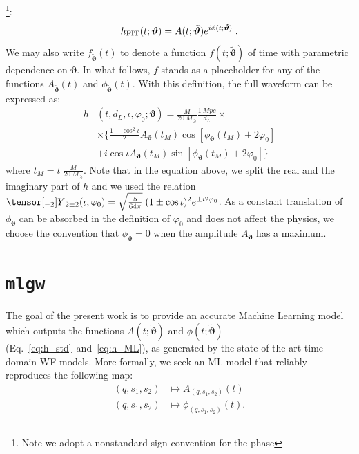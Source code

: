\documentclass[twocolumn,showpacs,preprintnumbers,nofootinbib,prd,
superscriptaddress,10pt]{revtex4-1}
\begin{document}
\footnote{Note we adopt a nonstandard sign convention for the phase}:
\begin{equation} \label{eq:h_ML}
	h_{\rm FIT}(t; \boldsymbol{\vartheta}) = A(t; \boldsymbol{\tilde{\vartheta}}) e^{i \phi(t; \boldsymbol{\tilde{\vartheta}})} \; . 
\end{equation}
We may also write $f_{\boldsymbol{\tilde{\vartheta}}}(t)$ to denote a 
function $f(t;\boldsymbol{\tilde{\vartheta}})$ of time with parametric dependence on $\boldsymbol{\vartheta}$.
In what follows, $f$ stands as a placeholder for any of the functions $A_{\tilde{\boldsymbol{\vartheta}}}(t)$ 
and ${\phi}_{\tilde{\boldsymbol{\vartheta}}}(t)$.
With this definition, the full waveform can be expressed as:
\begin{align} 
	h&(t, d_L,\iota,\varphi_0; \boldsymbol{\vartheta}) = \frac{M}{\SI{20}{M_\odot}} \frac{\SI{1}{Mpc}}{d_L} \times  \nonumber \\
		&\times \Bigg\{ \frac{1+\cos^2\iota}{2} A_{\boldsymbol{\vartheta}}(t_M)  \cos[\phi_{\boldsymbol{\vartheta}}(t_M)+2\varphi_0]  \nonumber \\
		&+ i \cos\iota A_{\boldsymbol{\vartheta}}(t_M)
 \sin[\phi_{\boldsymbol{\vartheta}}(t_M)+2\varphi_0] \Bigg\}
\label{eq:h_parametrization_simple}
\end{align}
where $t_M = t \; \frac{M}{\SI{20}{M_\odot}}$.
Note that in the equation above, we split the real and the imaginary part of $h$ and we 
used the relation ${\tensor[_{-2}]{Y}{_{2 \pm 2}}(\iota, \varphi_0) = \sqrt{\frac{5}{64\pi}} \; (1 \pm \cos \iota)^2 e^{\pm i 2 \varphi_0}}$.
As a constant translation of $\phi_{\boldsymbol{\vartheta}}$ can be absorbed in the definition of $\varphi_0$ and does not affect the physics, we choose the convention that $\phi_{\boldsymbol{\vartheta}} = 0$ when the amplitude $A_{\boldsymbol{\vartheta}}$ 
has a maximum.

\section{\lowercase{\texttt{mlgw}}}
\label{sec:model}
%
The goal of the present work is to provide an accurate Machine Learning model which outputs the functions $A(t;\boldsymbol{\tilde{\vartheta}})$ and $\phi(t;\boldsymbol{\tilde{\vartheta}})$ (Eq.~\eqref{eq:h_std}~and~\eqref{eq:h_ML}), as generated by the state-of-the-art time domain WF models.
More formally, we seek an ML model that reliably reproduces the following map:
\begin{align}
	(q, s_1, s_2) &\longmapsto A_{(q, s_1, s_2)}(t) \label{eq:objective_amp}\\
	(q, s_1, s_2) &\longmapsto \phi_{(q, s_1, s_2)}(t) . \label{eq:objective_ph}
\end{align}
\end{document}

